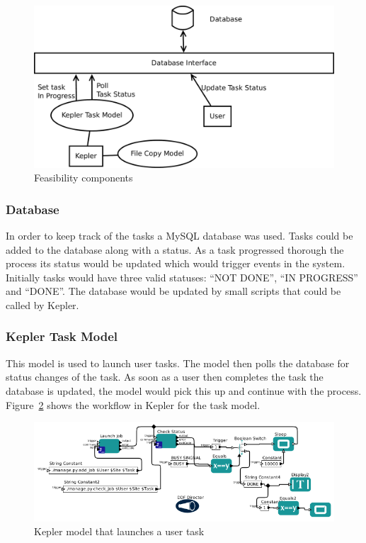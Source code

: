 \documentclass[12pt,a4paper]{report}
\begin{document}
\begin{figure}[!h]
    \begin{center}
        \includegraphics[scale=0.35]{figures/iter1_impl.pdf}
    \end{center}
    \caption{Feasibility components}
    \label{iter1_overview}
\end{figure}

\subsubsection{Database}
In order to keep track of the tasks a MySQL database was used. Tasks could be added
to the database along with a status. As a task progressed thorough the process its
status would be updated which would trigger events in the system. Initially tasks would
have three valid statuses: ``NOT DONE'', ``IN PROGRESS'' and ``DONE''. The database would
be updated by small scripts that could be called by Kepler.

\subsubsection{Kepler Task Model}

This model is used to launch user tasks. The model then polls the database for
status changes of the task. As soon as a user then completes the task the
database is updated, the model would pick this up and continue with the process.
Figure~\ref{kepler_task_model} shows the workflow in Kepler for the task model.

\begin{figure}[!h]
    \begin{center}
        \includegraphics[scale=0.6]{figures/task_model_kepler.png}
    \end{center}
    \caption{Kepler model that launches a user task}
    \label{kepler_task_model}
\end{figure}
\end{document}
